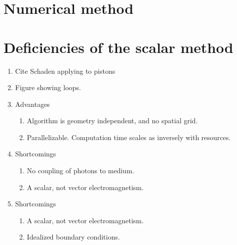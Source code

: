     \section{Numerical method}


    \section{Deficiencies of the scalar method}
\begin{enumerate}
  \item Cite Schaden applying to pistons\cite{Schaden2009}
  \item Figure showing loops.  
  \item Advantages
    \begin{enumerate}
      \item Algorithm is geometry independent, and no spatial grid.
      \item Parallelizable.  Computation time scales as inversely with resources.  
    \end{enumerate}

  \item Shortcomings
    \begin{enumerate}
      \item No coupling of photons to medium.
      \item A scalar, not vector electromagnetism.
    \end{enumerate}

  \item Shortcomings
    \begin{enumerate}
      \item A scalar, not vector electromagnetism.
      \item Idealized boundary conditions.  
    \end{enumerate}
  
\end{enumerate}




